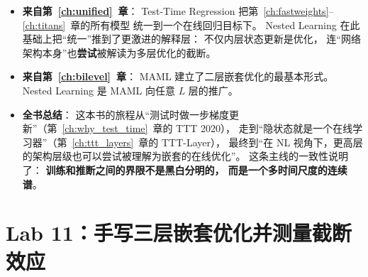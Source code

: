 \begin{itemize}
  \item \textbf{来自第~\ref{ch:unified}~章}：
    Test-Time Regression 把第~\ref{ch:fastweights}--\ref{ch:titans}~章的所有模型
    统一到一个在线回归目标下。
    Nested Learning 在此基础上把``统一''推到了更激进的解释层：
    不仅内层状态更新是优化，
    连``网络架构本身''也\textbf{尝试}被解读为多层优化的截断。

  \item \textbf{来自第~\ref{ch:bilevel}~章}：
    MAML 建立了二层嵌套优化的最基本形式。
    Nested Learning 是 MAML 向任意 $L$ 层的推广。

  \item \textbf{全书总结}：
    这本书的旅程从``测试时做一步梯度更新''（第~\ref{ch:why_test_time}~章的 TTT 2020），
    走到``隐状态就是一个在线学习器''（第~\ref{ch:ttt_layers}~章的 TTT-Layer），
    最终到``在 NL 视角下，更高层的架构层级也可以尝试被理解为嵌套的在线优化''。
    这条主线的一致性说明了：
    \textbf{训练和推断之间的界限不是黑白分明的，
    而是一个多时间尺度的连续谱}。
\end{itemize}

\section{Lab 11：手写三层嵌套优化并测量截断效应}
\label{sec:nested_lab}


